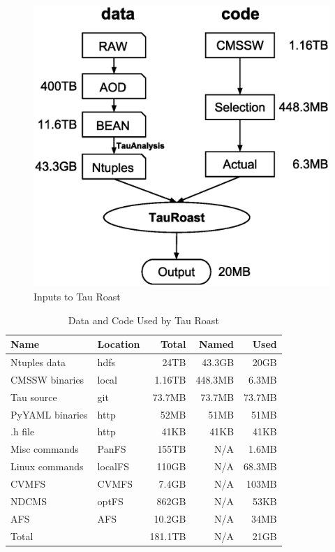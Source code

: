 \documentclass{acm_proc_article-sp}
\begin{document}
\begin{figure}[t]
\centering
\includegraphics[width=.8\columnwidth]{data-code-size.eps}
\caption{Inputs to Tau Roast}
\label{fig:data-code-size}
\end{figure}

\begin{table}[t]
    \centering
    \small
    \begin{tabular}{|l|l|r|r|r|}
        \hline
        \bf Name & \bf Location & \bf Total & \bf Named & \bf Used \\ 
        \hline
        Ntuples data    & hdfs & 24TB & 43.3GB & 20GB \\ \hline
        CMSSW binaries     & local & 1.16TB & 448.3MB & 6.3MB\\ \hline
        Tau source       & git & 73.7MB & 73.7MB & 73.7MB \\ \hline
        PyYAML binaries    & http & 52MB & 51MB & 51MB \\ \hline
        .h file       & http & 41KB & 41KB & 41KB \\ \hline
        Misc commands & PanFS & 155TB & N/A  & 1.6MB \\ \hline
        Linux commands & localFS & 110GB &  N/A & 68.3MB \\ \hline     
        CVMFS & CVMFS & 7.4GB & N/A & 103MB \\ \hline
        NDCMS & optFS & 862GB & N/A & 53KB \\ \hline
        AFS & AFS &10.2GB & N/A & 34MB\\ \hline
        Total      &    & 181.1TB            & N/A & 21GB \\ \hline
    \end{tabular}
    \caption{Data and Code Used by Tau Roast}
    \label{table:size-original-real}
\end{table}
\end{document}
